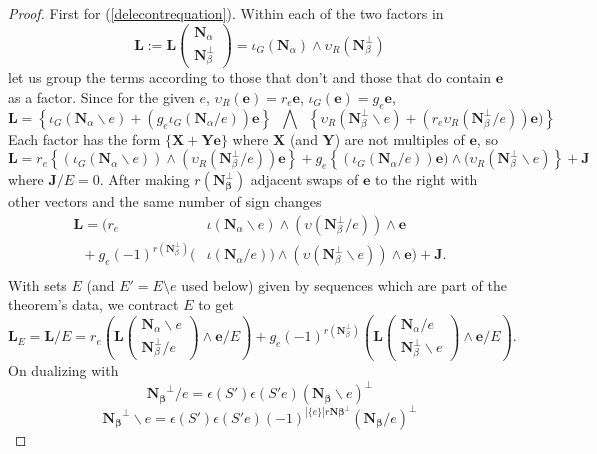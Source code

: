 \documentclass[Unicode]{cedram-alco}
\newcommand{\ext}[1]{\ensuremath{\mathbf{#1}}}
\newcommand{\eNal}{\ensuremath{\ext{N}_{\alpha}}}
\newcommand{\eNbePe}{\ensuremath{\ext{N}_{\beta}^{\perp}}}
\newcommand{\Is}{\ensuremath{\iota}}
\newcommand{\Vs}{\ensuremath{\upsilon}}
\begin{document}
\begin{proof}

First for (\ref{delecontrequation}). Within each of the two factors in
  \[
   \ext{L} := \ext{L}\left( \begin{array}{c} \eNal\\ \eNbePe \end{array} \right)
=\Is_G(\eNal)\wedge\Vs_R(\eNbePe)
  \]
let us group the terms according to those that don't and those that do
contain $\ext{e}$ as a factor.   Since for the given $e$, 
  $\Vs_R(\ext{e})=r_e\ext{e}$, $\Is_G(\ext{e})=g_e\ext{e}$,
\[
\ext{L} =
\left\{\Is_G(\eNal \backslash e) + (g_e\Is_G(\eNal/e))\ext{e}\right\}
\;\;\bigwedge\;\;
\left\{\Vs_R(\eNbePe\backslash e) + (r_e\Vs_R(\eNbePe/e))\ext{e})\right\}  
\]
Each factor has the form $\{\ext{X} + \ext{Y}\ext{e}\}$ where
$\ext{X}$ (and $\ext{Y}$) are not multiples of $\ext{e}$, so
\[
\ext{L}=
r_e\left\{ (\Is_G(\eNal\backslash e))\wedge (\Vs_R(\eNbePe/e))\ext{e} \right\}  +
g_e\left\{ (\Is_G(\eNal/e))\ext{e})  \wedge (\Vs_R(\eNbePe\backslash e)\right\}
+\ext{J}
\]
where $\ext{J}/E = 0$.
After making $r(\ext{N_\beta^\perp})$ adjacent swaps of $\ext{e}$ to the right with other
vectors and the same number of sign changes
\[
\begin{split} 
   \ext{L} = \Big( r_e  \;\;\; \;\;\;\;\;\;\;\;\;\;\;\;\;\; & \Is(\eNal\backslash e)  \wedge (\Vs(\eNbePe/e))      \wedge  \ext{e} \\
   \;\;+ g_e (-1)^{r(\eNbePe)} ( & \Is(\eNal/e))\wedge(\Vs(\eNbePe\backslash e))   \wedge  \ext{e}\Big)
+\ext{J}.\\
\end{split}
\]
With sets $E$ (and $E'=E\setminus e$ used below) given by sequences
which are part of the theorem's data, we contract $E$ to get
\[
\ext{L}_E=\ext{L}/E = r_e\left(\ext{L}\left(\begin{array}{c} \eNal\backslash e \\
    \eNbePe/e  \end{array} \right)  \wedge \ext{e} /E \right) +
   g_e(-1)^{r(\eNbePe)}\left(\ext{L}\left(\begin{array}{c} \eNal /e \\
    \eNbePe \backslash e \end{array} \right) \wedge \ext{e} /E \right).
   \]
On dualizing with
   \[
     \ext{N_\beta}^\perp/e  = \epsilon(S')\epsilon(S'e) (\ext{N_\beta}\backslash e)^\perp
     \]
     \[
       \ext{N_\beta}^\perp\backslash e = \epsilon(S')\epsilon(S'e)(-1)^{|\{e\}|r\ext{N\beta}^\perp}(\ext{N_\beta}/e)^\perp
\]
\end{proof}
\end{document}
